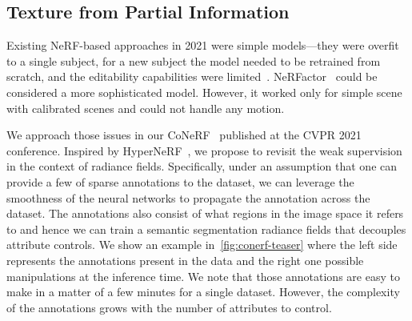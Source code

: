   
  \subsection{Texture from Partial Information}
    Existing NeRF-based approaches in 2021 were simple models---they were
    overfit to a single subject, for a new subject the model needed to be
    retrained from scratch, and the editability capabilities were
    limited~\cite{liu2021editing}.
    NeRFactor~\cite{zhang2021nerfactor} could be considered a more
    sophisticated model.
    However, it worked only for simple scene with calibrated scenes and could
    not handle any motion.

    We approach those issues in our CoNeRF~\cite{kania2022conerf} published at
    the CVPR 2021 conference.
    Inspired by HyperNeRF~\cite{park2021hypernerf}, we propose to revisit the
    weak supervision in the context of radiance fields.
    Specifically, under an assumption that one can provide a few of sparse
    annotations to the dataset, we can leverage the smoothness of the neural
    networks to propagate the annotation across the dataset.
    The annotations also consist of what regions in the image space it refers
    to and hence we can train a semantic segmentation radiance fields that
    decouples attribute controls.
    We show an example in~\cref{fig:conerf-teaser} where the left side
    represents the annotations present in the data and the right one possible
    manipulations at the inference time.
    We note that those annotations are easy to make in a matter of a few
    minutes for a single dataset.
    However, the complexity of the annotations grows with the number of
    attributes to control.

